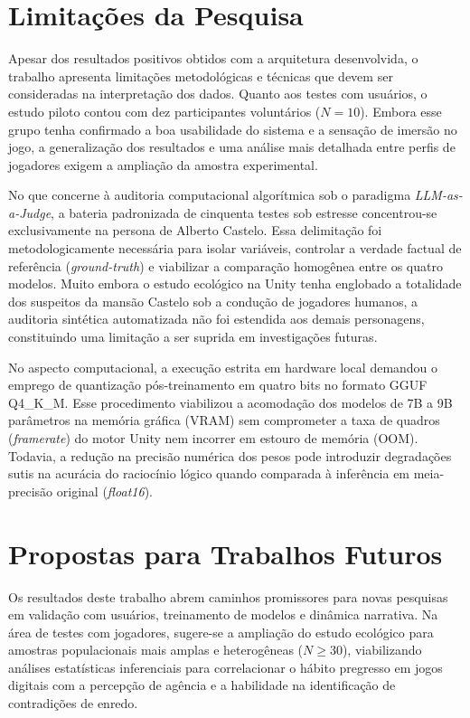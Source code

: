 \section{Limitações da Pesquisa}
\label{sec:concl_limitacoes}

Apesar dos resultados positivos obtidos com a arquitetura desenvolvida, o trabalho apresenta limitações metodológicas e técnicas que devem ser consideradas na interpretação dos dados. Quanto aos testes com usuários, o estudo piloto contou com dez participantes voluntários ($N = 10$). Embora esse grupo tenha confirmado a boa usabilidade do sistema e a sensação de imersão no jogo, a generalização dos resultados e uma análise mais detalhada entre perfis de jogadores exigem a ampliação da amostra experimental.

No que concerne à auditoria computacional algorítmica sob o paradigma \textit{LLM-as-a-Judge}, a bateria padronizada de cinquenta testes sob estresse concentrou-se exclusivamente na persona de Alberto Castelo. Essa delimitação foi metodologicamente necessária para isolar variáveis, controlar a verdade factual de referência (\textit{ground-truth}) e viabilizar a comparação homogênea entre os quatro modelos. Muito embora o estudo ecológico na Unity tenha englobado a totalidade dos suspeitos da mansão Castelo sob a condução de jogadores humanos, a auditoria sintética automatizada não foi estendida aos demais personagens, constituindo uma limitação a ser suprida em investigações futuras.

No aspecto computacional, a execução estrita em hardware local demandou o emprego de quantização pós-treinamento em quatro bits no formato GGUF Q4\_K\_M. Esse procedimento viabilizou a acomodação dos modelos de 7B a 9B parâmetros na memória gráfica (VRAM) sem comprometer a taxa de quadros (\textit{framerate}) do motor Unity nem incorrer em estouro de memória (OOM). Todavia, a redução na precisão numérica dos pesos pode introduzir degradações sutis na acurácia do raciocínio lógico quando comparada à inferência em meia-precisão original (\textit{float16}).

\section{Propostas para Trabalhos Futuros}
\label{sec:concl_futuros}

Os resultados deste trabalho abrem caminhos promissores para novas pesquisas em validação com usuários, treinamento de modelos e dinâmica narrativa. Na área de testes com jogadores, sugere-se a ampliação do estudo ecológico para amostras populacionais mais amplas e heterogêneas ($N \ge 30$), viabilizando análises estatísticas inferenciais para correlacionar o hábito pregresso em jogos digitais com a percepção de agência e a habilidade na identificação de contradições de enredo.

